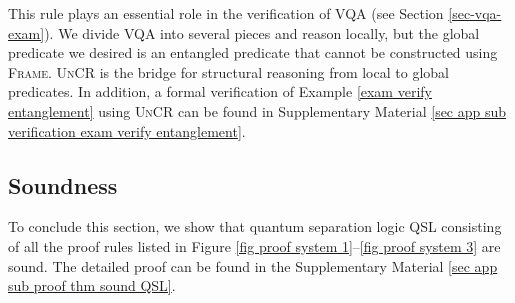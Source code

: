 \documentclass[conference,compsoc, 10pt]{IEEEtran}
\newcommand{\jh}[1]{\textit{\color{red}[JH] : #1}}
\newcommand{\lz}[1]{\textit{\color{blue}[LZ] : #1}}
\newcommand {\qbar} {{\overline{q}}}
\newcommand {\cE } {{\mathcal{E}}}
\begin{document}
	This rule plays an essential role in the verification of VQA (see Section \ref{sec-vqa-exam}). We divide VQA into several pieces and reason locally, but the global predicate we desired is an entangled predicate that cannot be constructed using \textsc{Frame}. \textsc{UnCR} is the bridge for structural reasoning from local to global predicates. In addition, a formal verification of Example \ref{exam verify entanglement} using \textsc{UnCR} can be found in Supplementary Material \ref{sec app sub verification exam verify entanglement}.
	
	
	
	
	\subsection{Soundness}
	
	To conclude this section, we show that quantum separation logic QSL consisting
  of all the proof rules listed in Figure \ref{fig proof system 1}--\ref{fig
  proof system 3} are sound. The detailed proof can be found in the Supplementary Material \ref{sec app sub proof thm sound QSL}.
	
\end{document}
